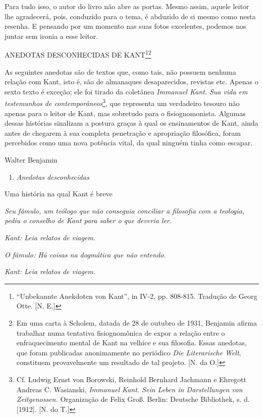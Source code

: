 Para tudo isso, o autor do livro não abre as portas. Mesmo assim, aquele
leitor lhe agradecerá, pois, conduzido para o tema, é abduzido de si
mesmo como nesta resenha. E pensando por um momento nas suas fotos
excelentes, podemos nos juntar sem ironia a esse leitor.

ANEDOTAS DESCONHECIDAS DE KANT\footnote{``Unbekannte Anekdoten von
  Kant'', in  IV-2, pp. 808-815. Tradução de Georg Otte. [N.
  E.]}\footnote{Em uma carta à Scholem, datada de 28 de outubro de
  1931, Benjamin afirma trabalhar numa tentativa fisiognomônica de expor
  a relação entre o enfraquecimento mental de Kant na velhice e sua
  filosofia. Essas anedotas, que foram publicadas anonimamente no
  periódico \emph{Die Literarische Welt}, constituem provavelmente um
  resultado de tal projeto. [N. da O.]}

As seguintes anedotas são de textos que, como tais, não possuem nenhuma
relação com Kant, isto é, são de almanaques desaparecidos, revistas etc.
Apenas o sexto texto é exceção; ele foi tirado da coletânea
\emph{Immanuel Kant. Sua vida em testemunhos de
contemporâneos}\footnote{Cf. Ludwig Ernst von Borowski, Reinhold
  Bernhard Jachmann e Ehregott Andreas C. Wasianski, \emph{Immanuel
  Kant. Sein Leben in Darstellungen von Zeitgenossen.} Organização de
  Felix Groß. Berlin: Deutsche Bibliothek, s. d. [1912]. [N. do T.]}, que representa um verdadeiro tesouro não apenas para o
leitor de Kant, mas sobretudo para o fisiognomonista. Algumas dessas
histórias sinalizam a postura graças à qual os ensinamentos de Kant,
ainda antes de chegarem à sua completa penetração e apropriação
filosófica, foram percebidos como uma nova potência vital, da qual
ninguém tinha como escapar.

Walter Benjamin

\begin{enumerate}
\def\labelenumi{\Roman{enumi}.}
\item
  \emph{Anedotas desconhecidas}
\end{enumerate}

Uma história na qual Kant é breve

\emph{Seu fâmulo, um teólogo que não conseguia conciliar a filosofia com
a teologia, pediu o conselho de Kant para saber o que deveria ler.}

\emph{Kant: Leia relatos de viagem.}

\emph{O fâmulo: Há coisas na dogmática que não entendo.}

\emph{Kant: Leia relatos de viagem.}

